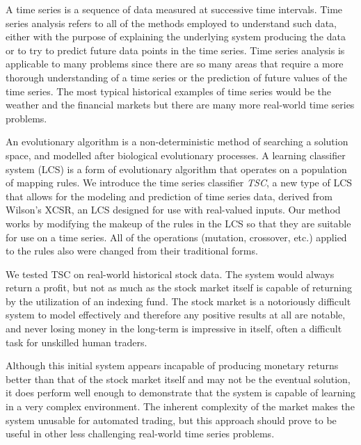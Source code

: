 

A time series is a sequence of data measured at successive time intervals.
Time series analysis refers to all of the methods employed to understand such data, either with the purpose of explaining the underlying system producing the data or to try to predict future data points in the time series.
Time series analysis is applicable to many problems since there are so many areas that require a more thorough understanding of a time series or the prediction of future values of the time series.
The most typical historical examples of time series would be the weather and the financial markets but there are many more real-world time series problems.

An evolutionary algorithm is a non-deterministic method of searching a solution space, and modelled after biological evolutionary processes.
A learning classifier system (LCS) is a form of evolutionary algorithm that operates on a population of mapping rules.
We introduce the time series classifier \emph{TSC}, a new type of LCS that allows for the modeling and prediction of time series data, derived from Wilson's XCSR, an LCS designed for use with real-valued inputs.
Our method works by modifying the makeup of the rules in the LCS so that they are suitable for use on a time series.
All of the operations (mutation, crossover, etc.) applied to the rules also were changed from their traditional forms.

We tested TSC on real-world historical stock data.
The system would always return a profit, but not as much as the stock market itself is capable of returning by the utilization of an indexing fund.
The stock market is a notoriously difficult system to model effectively and therefore any positive results at all are notable, and never losing money in the long-term is impressive in itself, often a difficult task for unskilled human traders.

Although this initial system appears incapable of producing monetary returns better than that of the stock market itself and may not be the eventual solution, it does perform well enough to demonstrate that the system is capable of learning in a very complex environment.
The inherent complexity of the market makes the system unusable for automated trading, but this approach should prove to be useful in other less challenging real-world time series problems.
